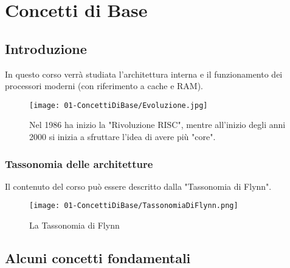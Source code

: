 \chapter{Concetti di Base}

\section{Introduzione}

In questo corso verrà studiata l'architettura interna e il funzionamento dei processori moderni (con riferimento a cache e RAM).


\begin{figure}[h]
    \centering
    \texttt{[image: 01-ConcettiDiBase/Evoluzione.jpg]}
    \caption{Nel 1986 ha inizio la "Rivoluzione RISC", mentre all'inizio degli anni 2000 si inizia a sfruttare l'idea di avere più "core".}
\end{figure}

\subsection{Tassonomia delle architetture}

Il contenuto del corso può essere descritto dalla "Tassonomia di Flynn". 


\begin{figure}[h]
    \centering
    \texttt{[image: 01-ConcettiDiBase/TassonomiaDiFlynn.png]}
    \caption{La Tassonomia di Flynn}
\end{figure}

\section{Alcuni concetti fondamentali}




